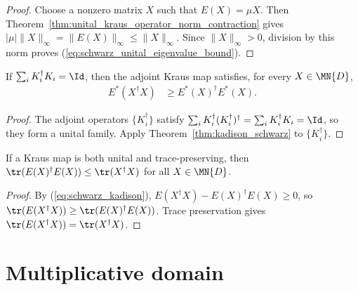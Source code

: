 \begin{proof}
    \leanok
    Choose a nonzero matrix $X$ such that $E(X)=\mu X$. Then
    Theorem~\ref{thm:unital_kraus_operator_norm_contraction} gives
    $|\mu|\|X\|_\infty=\|E(X)\|_\infty\leq\|X\|_\infty$.
    Since $\|X\|_\infty>0$, division by this norm proves
    (\ref{eq:schwarz_unital_eigenvalue_bound}).
\end{proof}

\begin{theorem}\label{thm:kadison_schwarz_adjoint}
    \leanok
    If $\sum_i K_i^\dagger K_i = \Id$, then the adjoint Kraus map satisfies,
    for every $X \in \MN{D}$,
    \begin{align}
        E^*(X^\dagger X)
        &\geq E^*(X)^\dagger E^*(X).
        \label{eq:schwarz_adjoint_kadison}
    \end{align}
\end{theorem}

\begin{proof}
    \leanok
    The adjoint operators $\{K_i^\dagger\}$ satisfy
    $\sum_i K_i^\dagger (K_i^\dagger)^\dagger
    = \sum_i K_i^\dagger K_i = \Id$, so they form a unital family.
    Apply Theorem~\ref{thm:kadison_schwarz} to $\{K_i^\dagger\}$.
\end{proof}

\begin{theorem}\label{thm:hs_contraction}
    \leanok
    If a Kraus map is both unital and trace-preserving, then
    $\tr(E(X)^\dagger E(X)) \le \tr(X^\dagger X)$
    for all $X \in \MN{D}$.
\end{theorem}

\begin{proof}\leanok{}
    By (\ref{eq:schwarz_kadison}),
    $E(X^\dagger X) - E(X)^\dagger E(X) \ge 0$, so
    $\tr(E(X^\dagger X)) \ge \tr(E(X)^\dagger E(X))$.
    Trace preservation gives $\tr(E(X^\dagger X)) = \tr(X^\dagger X)$.
\end{proof}

\section{Multiplicative domain}

